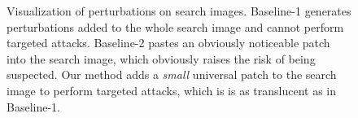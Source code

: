 \documentclass[journal]{IEEEtran}
\begin{document}
\begin{figure}[t]
  \centering
  \caption{Visualization of perturbations on search images. Baseline-1 generates perturbations added to the whole search image and cannot perform targeted attacks. Baseline-2 pastes an obviously noticeable patch into the search image, which obviously raises the risk of being suspected. Our method adds a \textit{small} universal patch to the search image to perform targeted attacks, which is is as translucent as in Baseline-1.}
  \label{fig:imperceptible}
  \vspace{-3mm}
\end{figure}
\end{document}

